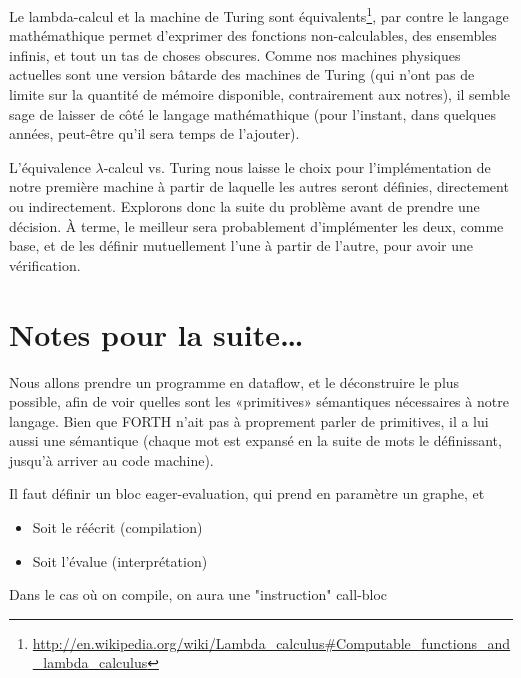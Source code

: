 \documentclass{article}
\begin{document}
Le lambda-calcul et la machine de Turing sont équivalents\footnote{\url{http://en.wikipedia.org/wiki/Lambda_calculus\#Computable_functions_and_lambda_calculus}}, par contre le langage mathémathique permet d'exprimer des fonctions non-calculables, des ensembles infinis, et tout un tas de choses obscures. Comme nos machines physiques actuelles sont une version bâtarde des machines de Turing (qui n'ont pas de limite sur la quantité de mémoire disponible, contrairement aux notres), il semble sage de laisser de côté le langage mathémathique (pour l'instant, dans quelques années, peut-être qu'il sera temps de l'ajouter).

L'équivalence $\lambda$-calcul vs. Turing nous laisse le choix pour l'implémentation de notre première machine à partir de laquelle les autres seront définies, directement ou indirectement. Explorons donc la suite du problème avant de prendre une décision. À terme, le meilleur sera probablement d'implémenter les deux, comme base, et de les définir mutuellement l'une à partir de l'autre, pour avoir une vérification.

\section{Notes pour la suite\dots}




Nous allons prendre un programme en dataflow, et le déconstruire le plus possible, afin de voir quelles sont les «primitives» sémantiques nécessaires à notre langage. Bien que FORTH n'ait pas à proprement parler de primitives, il a lui aussi une sémantique (chaque mot est expansé en la suite de mots le définissant, jusqu'à arriver au code machine).
  

Il faut définir un bloc eager-evaluation, qui prend en paramètre un graphe, et
\begin{itemize}
\item Soit le réécrit (compilation)
\item Soit l'évalue (interprétation)
\end{itemize}
Dans le cas où on compile, on aura une "instruction" call-bloc
\end{document}
